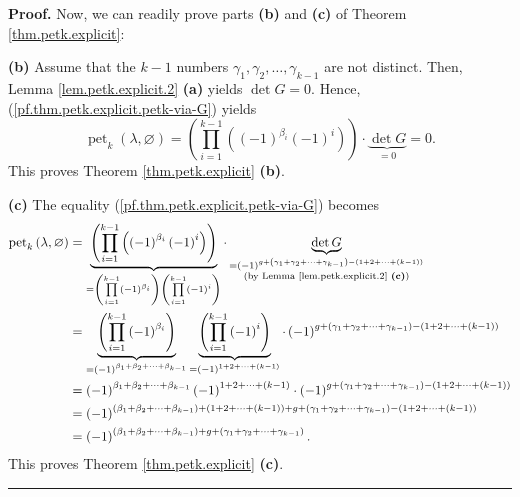 \documentclass[numbers=enddot,12pt,final,onecolumn,notitlepage]{scrartcl}%
\theoremstyle{definition}
\newenvironment{proof}[1][Proof]{\noindent\textbf{#1.} }{\ \rule{0.5em}{0.5em}}
\let\prodnonlimits\prod
\renewcommand{\prod}{\prodnonlimits\limits}
\begin{document}
\begin{proof}
Now, we can readily prove parts \textbf{(b)} and \textbf{(c)} of Theorem
\ref{thm.petk.explicit}:

\textbf{(b)} Assume that the $k-1$ numbers $\gamma_{1},\gamma_{2}%
,\ldots,\gamma_{k-1}$ are not distinct. Then, Lemma \ref{lem.petk.explicit.2}
\textbf{(a)} yields $\det G=0$. Hence, (\ref{pf.thm.petk.explicit.petk-via-G})
yields%
\[
\operatorname*{pet}\nolimits_{k}\left(  \lambda,\varnothing\right)  =\left(
\prod_{i=1}^{k-1}\left(  \left(  -1\right)  ^{\beta_{i}}\left(  -1\right)
^{i}\right)  \right)  \cdot\underbrace{\det G}_{=0}=0.
\]
This proves Theorem \ref{thm.petk.explicit} \textbf{(b)}.

\textbf{(c)} The equality (\ref{pf.thm.petk.explicit.petk-via-G}) becomes%
\begin{align*}
\operatorname*{pet}\nolimits_{k}\left(  \lambda,\varnothing\right)   &
=\underbrace{\left(  \prod_{i=1}^{k-1}\left(  \left(  -1\right)  ^{\beta_{i}%
}\left(  -1\right)  ^{i}\right)  \right)  }_{=\left(  \prod_{i=1}^{k-1}\left(
-1\right)  ^{\beta_{i}}\right)  \left(  \prod_{i=1}^{k-1}\left(  -1\right)
^{i}\right)  }\cdot\underbrace{\det G}_{\substack{=\left(  -1\right)
^{g+\left(  \gamma_{1}+\gamma_{2}+\cdots+\gamma_{k-1}\right)  -\left(
1+2+\cdots+\left(  k-1\right)  \right)  }\\\text{(by Lemma
\ref{lem.petk.explicit.2} \textbf{(c)})}}}\\
&  =\underbrace{\left(  \prod_{i=1}^{k-1}\left(  -1\right)  ^{\beta_{i}%
}\right)  }_{=\left(  -1\right)  ^{\beta_{1}+\beta_{2}+\cdots+\beta_{k-1}}%
}\underbrace{\left(  \prod_{i=1}^{k-1}\left(  -1\right)  ^{i}\right)
}_{=\left(  -1\right)  ^{1+2+\cdots+\left(  k-1\right)  }}\cdot\left(
-1\right)  ^{g+\left(  \gamma_{1}+\gamma_{2}+\cdots+\gamma_{k-1}\right)
-\left(  1+2+\cdots+\left(  k-1\right)  \right)  }\\
&  =\left(  -1\right)  ^{\beta_{1}+\beta_{2}+\cdots+\beta_{k-1}}\left(
-1\right)  ^{1+2+\cdots+\left(  k-1\right)  }\cdot\left(  -1\right)
^{g+\left(  \gamma_{1}+\gamma_{2}+\cdots+\gamma_{k-1}\right)  -\left(
1+2+\cdots+\left(  k-1\right)  \right)  }\\
&  =\left(  -1\right)  ^{\left(  \beta_{1}+\beta_{2}+\cdots+\beta
_{k-1}\right)  +\left(  1+2+\cdots+\left(  k-1\right)  \right)  +g+\left(
\gamma_{1}+\gamma_{2}+\cdots+\gamma_{k-1}\right)  -\left(  1+2+\cdots+\left(
k-1\right)  \right)  }\\
&  =\left(  -1\right)  ^{\left(  \beta_{1}+\beta_{2}+\cdots+\beta
_{k-1}\right)  +g+\left(  \gamma_{1}+\gamma_{2}+\cdots+\gamma_{k-1}\right)  }.
\end{align*}
This proves Theorem \ref{thm.petk.explicit} \textbf{(c)}.
\end{proof}
\end{document}
